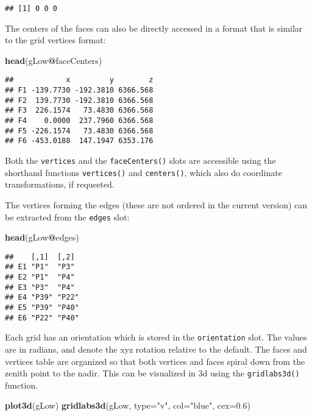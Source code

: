 \documentclass[]{article}
\newenvironment{Shaded}{\begin{snugshade}}{\end{snugshade}}
\newcommand{\KeywordTok}[1]{\textcolor[rgb]{0.13,0.29,0.53}{\textbf{#1}}}
\newcommand{\DataTypeTok}[1]{\textcolor[rgb]{0.13,0.29,0.53}{#1}}
\newcommand{\FloatTok}[1]{\textcolor[rgb]{0.00,0.00,0.81}{#1}}
\newcommand{\StringTok}[1]{\textcolor[rgb]{0.31,0.60,0.02}{#1}}
\newcommand{\OperatorTok}[1]{\textcolor[rgb]{0.81,0.36,0.00}{\textbf{#1}}}
\newcommand{\NormalTok}[1]{#1}
\begin{document}
\begin{verbatim}
## [1] 0 0 0
\end{verbatim}

The centers of the faces can also be directly accessed in a format that
is similar to the grid vertices format:

\begin{Shaded}
\begin{Highlighting}[]
\KeywordTok{head}\NormalTok{(gLow}\OperatorTok{@}\NormalTok{faceCenters)}
\end{Highlighting}
\end{Shaded}

\begin{verbatim}
##            x         y        z
## F1 -139.7730 -192.3810 6366.568
## F2  139.7730 -192.3810 6366.568
## F3  226.1574   73.4830 6366.568
## F4    0.0000  237.7960 6366.568
## F5 -226.1574   73.4830 6366.568
## F6 -453.0188  147.1947 6353.176
\end{verbatim}

Both the \texttt{vertices} and the \texttt{faceCenters()} slots are
accessible using the shorthand functions \texttt{vertices()} and
\texttt{centers()}, which also do coordinate transformations, if
requested.

The vertices forming the edges (these are not ordered in the current
version) can be extracted from the \texttt{edges} slot:

\begin{Shaded}
\begin{Highlighting}[]
\KeywordTok{head}\NormalTok{(gLow}\OperatorTok{@}\NormalTok{edges)}
\end{Highlighting}
\end{Shaded}

\begin{verbatim}
##    [,1]  [,2] 
## E1 "P1"  "P3" 
## E2 "P1"  "P4" 
## E3 "P3"  "P4" 
## E4 "P39" "P22"
## E5 "P39" "P40"
## E6 "P22" "P40"
\end{verbatim}

Each grid has an orientation which is stored in the \texttt{orientation}
slot. The values are in radians, and denote the xyz rotation relative to
the default. The faces and vertices table are organized so that both
vertices and faces spiral down from the zenith point to the nadir. This
can be visualized in 3d using the \texttt{gridlabs3d()} function.

\begin{Shaded}
\begin{Highlighting}[]
\KeywordTok{plot3d}\NormalTok{(gLow)}
\KeywordTok{gridlabs3d}\NormalTok{(gLow, }\DataTypeTok{type=}\StringTok{"v"}\NormalTok{, }\DataTypeTok{col=}\StringTok{"blue"}\NormalTok{, }\DataTypeTok{cex=}\FloatTok{0.6}\NormalTok{)}
\end{Highlighting}
\end{Shaded}
\end{document}
